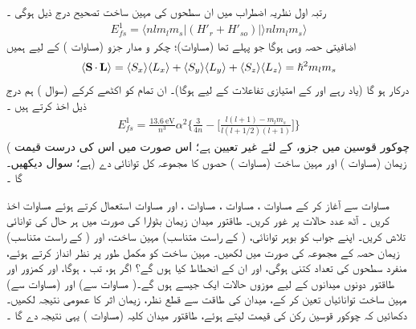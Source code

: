  رتبہ اول نظریہ اضطراب میں ان سطحوں کی مہین ساخت تصحیح درج ذیل ہوگی ۔
\begin{align}\label{مساوات_غیر_مضطرب_نظریہ_اضطراب_پہلی_تصحیح}
E_{fs}^1 = \langle nlm_l m_s | (H'_r + H'_{so}) | \rangle nlm_l m_s \rangle
\end{align}
اضافیتی حصہ وہی ہوگا جو پہلے تھا (مساوات)؛   چکر و مدار جزو  (مساوات )   کے لیے ہمیں
\begin{align}\label{مساوات_غیر_مضطرب_نقطی_ضرب}
\langle \operatorname{\mathbf{S}} \cdot \operatorname{\mathbf{L}} \rangle = \langle S_x \rangle \langle L_x \rangle + \langle S_y \rangle \langle L_y \rangle + \langle S_z \rangle \langle L_z \rangle = \hslash^2 m_l m_s
\end{align}
درکار ہو گا (یاد  رہے   اور  کے  امتیازی تفاعلات کے لیے  ہوگا)۔   ان تمام کو اکٹھے کرکے (سوال  ) ہم درج ذیل اخذ کرتے ہیں ۔
\begin{align}\label{مساوت_غیر_مضطرب_طاقتور_مہین_ساخت_حصہ}
E_{fs}^1 = \frac{\SI{13.6}{\electronvolt}}{n^3} \alpha^2 \Big \{ \frac{3}{4n} - \Big [ \frac{l(l + 1) - m_l m_s}{l(l + 1/2)(l + 1)} \Big ] \Big\}
\end{align}
( چوکور  قوسین    میں جزو،    کے لئے غیر تعیین ہے؛  اس  صورت میں اس کی درست قیمت    ہے؛  سوال    دیکھیں۔) زیمان   (مساوات )  اور مہین ساخت   (مساوات  )    حصوں کا مجموعہ کل توانائی دے گا ۔
 
مساوات    سے آغاز کر کے مساوات  ،  مساوات ، مساوات ، اور  مساوات   استعمال کرتے ہوئے مساوات  اخذ کریں ۔
آٹھ عدد  حالات   پر غور کریں۔ طاقتور میدان زیمان بٹوارا  کی صورت میں ہر حال کی توانائی تلاش کریں۔  اپنے جواب کو بوہر توانائی،  (   کے راست متناسب)  مہین ساخت،  اور  (  کے راست متناسب)  زیمان حصہ کے مجموعہ کی صورت میں لکھیں۔ مہین  ساخت کو مکمل طور پر نظر انداز کرتے ہوئے،  منفرد سطحوں کی تعداد کتنی ہوگی،  اور ان کے انحطاط کیا ہوں گے؟ 
اگر  ہو،  تب ،  ہوگا،  اور  کمزور اور طاقتور دونوں میدانوں کے لیے موزوں حالات  ایک  جیسے ہوں گے۔( مساوات  سے)   اور  (مساوات  سے)  مہین ساخت توانائیاں تعین کر کے،  میدان کی طاقت سے قطع نظر،    زیمان اثر کا عمومی نتیجہ لکھیں۔ دکھائیں کہ   چوکور قوسین   رکن کی قیمت   لیتے ہوئے،  طاقتور میدان کلیہ (مساوات  )  یہی نتیجہ دے گا  ۔


